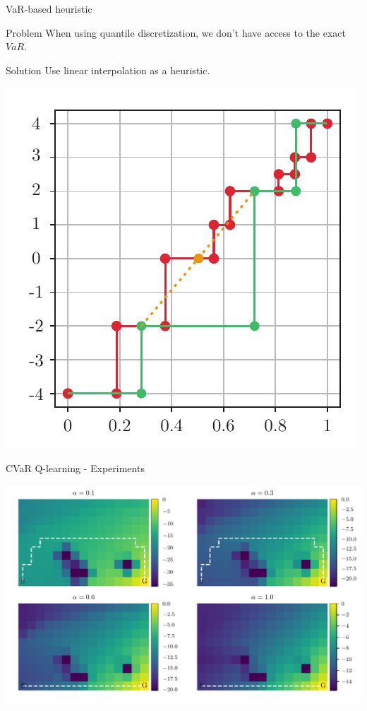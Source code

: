 \documentclass{beamer}
\begin{document}
\begin{frame}{VaR-based heuristic}
\begin{alertblock}
{Problem} When using quantile discretization, we don't have access to the exact $VaR$.
\end{alertblock}
\begin{exampleblock}
{Solution} Use linear interpolation as a heuristic.
\end{exampleblock}
\center
\includegraphics[width=0.38\linewidth]{../gfx/heuristic.pdf}
\end{frame}


\begin{frame}{CVaR Q-learning - Experiments}

\center
\includegraphics[width=\linewidth]{../gfx/q_optimal_paths.pdf}

\end{frame}

%
%
\end{document}
